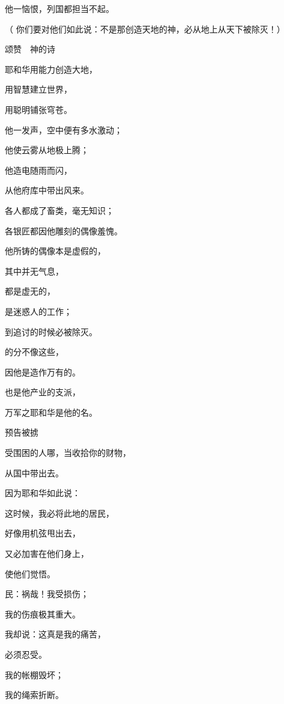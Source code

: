 {\par }{\Q 他一恼恨，列国都担当不起。
\par }{\PP （
你们要对他们如此说：不是那创造天地的神，必从地上从天下被除灭！）
\par }{\SH 颂赞　神的诗
\par }{\Q {}耶和华用能力创造大地，
\par }{\Q 用智慧建立世界，
\par }{\Q 用聪明铺张穹苍。
\par }{\Q {}他一发声，空中便有多水激动；
\par }{\Q 他使云雾从地极上腾；
\par }{\Q 他造电随雨而闪，
\par }{\Q 从他府库中带出风来。
\par }{\Q {}各人都成了畜类，毫无知识；
\par }{\Q 各银匠都因他雕刻的偶像羞愧。
\par }{\Q 他所铸的偶像本是虚假的，
\par }{\Q 其中并无气息，
\par }{\Q {}都是虚无的，
\par }{\Q 是迷惑人的工作；
\par }{\Q 到追讨的时候必被除灭。
\par }{\Q {}的分不像这些，
\par }{\Q 因他是造作万有的{}。
\par }{也是他产业的支派，
\par }{\Q 万军之耶和华是他的名。
\par }{\SH 预告被掳
\par }{\Q {}受围困的人哪，当收拾你的财物，
\par }{\Q 从国中带出去。
\par }{\Q {}因为耶和华如此说：
\par }{\Q 这时候，我必将此地的居民，
\par }{\Q 好像用机弦甩出去，
\par }{\Q 又必加害在他们身上，
\par }{\Q 使他们觉悟。
\par }{\BB \par }{\Q {}民{}：祸哉！我受损伤；
\par }{\Q 我的伤痕极其重大。
\par }{\Q 我却说：这真是我的痛苦，
\par }{\Q 必须忍受。
\par }{\Q {}我的帐棚毁坏；
\par }{\Q 我的绳索折断。
}
